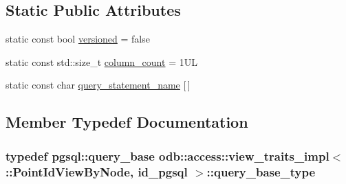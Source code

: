 \subsection*{Static Public Attributes}
\begin{DoxyCompactItemize}
\item 
static const bool \hyperlink{classodb_1_1access_1_1view__traits__impl_3_01_1_1_point_id_view_by_node_00_01id__pgsql_01_4_a587654819c455d3c4190e3409122850e}{versioned} = false
\item 
static const std\+::size\+\_\+t \hyperlink{classodb_1_1access_1_1view__traits__impl_3_01_1_1_point_id_view_by_node_00_01id__pgsql_01_4_a8a6589faac6def91e0d6aea4600bdd4d}{column\+\_\+count} = 1\+U\+L
\item 
static const char \hyperlink{classodb_1_1access_1_1view__traits__impl_3_01_1_1_point_id_view_by_node_00_01id__pgsql_01_4_a42a65b1c29441e287c57758140a0cd27}{query\+\_\+statement\+\_\+name} \mbox{[}$\,$\mbox{]}
\end{DoxyCompactItemize}


\subsection{Member Typedef Documentation}
\hypertarget{classodb_1_1access_1_1view__traits__impl_3_01_1_1_point_id_view_by_node_00_01id__pgsql_01_4_a3e39fad2f5702025ced735c78b6306b1}{}
\subsubsection[{query\+\_\+base\+\_\+type}]{\setlength{\rightskip}{0pt plus 5cm}typedef pgsql\+::query\+\_\+base odb\+::access\+::view\+\_\+traits\+\_\+impl$<$ \+::{\bf Point\+Id\+View\+By\+Node}, id\+\_\+pgsql $>$\+::{\bf query\+\_\+base\+\_\+type}}\label{classodb_1_1access_1_1view__traits__impl_3_01_1_1_point_id_view_by_node_00_01id__pgsql_01_4_a3e39fad2f5702025ced735c78b6306b1}
\hypertarget{classodb_1_1access_1_1view__traits__impl_3_01_1_1_point_id_view_by_node_00_01id__pgsql_01_4_ace8d635e8174d93c66df56bdf5008816}{}
